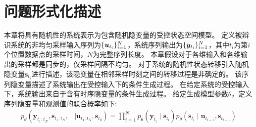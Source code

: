 \section{问题形式化描述}
\label{sec:5_formal}
本章将具有随机性的系统表示为包含随机隐变量的受控状态空间模型。
定义被辨识系统的非均匀采样输入序列为$\{\boldsymbol{u}_{t_i}\}_{i=1}^{N}$，系统序列输出为$\{\boldsymbol{y}_{t_i}\}_{i=1}^{N}$，其中$t_i$为第$i$个位置数据点的采样时间，$N$为完整序列长度。
本章假设对于各维输入和各维输出的采样都是同步的，仅采样间隔不均匀。
对于系统的随机性状态转移引入随机隐变量$\boldsymbol{s}_{t_{i}}$进行描述，该隐变量在相邻采样时刻之间的转移过程是非确定的。
该序列隐变量描述了系统输出在受控输入下的条件生成过程。
在给定系统的受控输入下，系统输出来自于含有时序隐变量的条件生成过程。
给定生成模型参数$\theta$，定义序列隐变量和观测值的联合概率如下:
\begin{equation}
    \begin{aligned}
    p_{\theta}\left(\boldsymbol{y}_{t_1: t_N}, \boldsymbol{s}_{t_1:t_N},\right.&\left. \mid \boldsymbol{u}_{t_1: t_N}, \boldsymbol{s}_{t_0}\right)=\prod_{i=1}^{N}
    p_{\theta}\left(\boldsymbol{y}_{t_i} \mid \boldsymbol{s}_{t_i}\right)   {p}_{\theta}\left(\boldsymbol{s}_{t_i} \mid \boldsymbol{u}_{t_{i-1}},\boldsymbol{s}_{t_{i-1}}\right)
    \end{aligned}
    \label{equ:discrete_rssm}
\end{equation}

